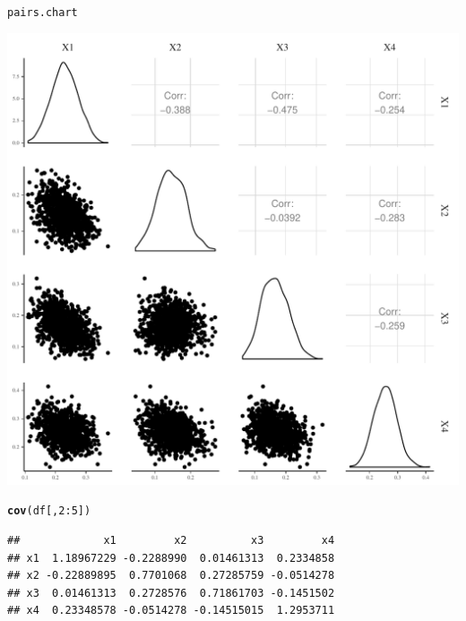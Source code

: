\documentclass[11pt,a4paper,twoside]{book}\usepackage[]{graphicx}\usepackage[]{color}
\makeatletter
\def\maxwidth{ %
  \ifdim\Gin@nat@width>\linewidth
    \linewidth
  \else
    \Gin@nat@width
  \fi
}
\newcommand{\hlnum}[1]{\textcolor[rgb]{0.686,0.059,0.569}{#1}}%
\newcommand{\hlopt}[1]{\textcolor[rgb]{0,0,0}{#1}}%
\newcommand{\hlstd}[1]{\textcolor[rgb]{0.345,0.345,0.345}{#1}}%
\newcommand{\hlkwd}[1]{\textcolor[rgb]{0.737,0.353,0.396}{\textbf{#1}}}%
\newenvironment{kframe}{%
 \def\at@end@of@kframe{}%
 \ifinner\ifhmode%
  \def\at@end@of@kframe{\end{minipage}}%
  \begin{minipage}{\columnwidth}%
 \fi\fi%
 \def\FrameCommand##1{\hskip\@totalleftmargin \hskip-\fboxsep
 \colorbox{shadecolor}{##1}\hskip-\fboxsep
     \hskip-\linewidth \hskip-\@totalleftmargin \hskip\columnwidth}%
 \MakeFramed {\advance\hsize-\width
   \@totalleftmargin\z@ \linewidth\hsize
   \@setminipage}}%
 {\par\unskip\endMakeFramed%
 \at@end@of@kframe}
\newenvironment{knitrout}{}{} %
\makeatother
\begin{document}
\begin{knitrout}
\begin{kframe}
\begin{alltt}
\hlstd{pairs.chart}
\end{alltt}
\end{kframe}
\includegraphics[width=\maxwidth]{figure/ch03_figcovuncertainty-1} 
\begin{kframe}\begin{alltt}
\hlkwd{cov}\hlstd{(df[,}\hlnum{2}\hlopt{:}\hlnum{5}\hlstd{])}
\end{alltt}
\begin{verbatim}
##             x1         x2          x3         x4
## x1  1.18967229 -0.2288990  0.01461313  0.2334858
## x2 -0.22889895  0.7701068  0.27285759 -0.0514278
## x3  0.01461313  0.2728576  0.71861703 -0.1451502
## x4  0.23348578 -0.0514278 -0.14515015  1.2953711
\end{verbatim}
\end{kframe}
\end{knitrout}
\end{document}

